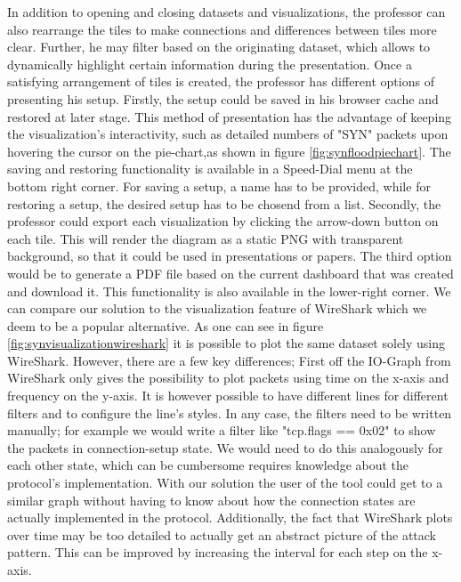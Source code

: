 In addition to opening and closing datasets and visualizations, the professor can also rearrange the tiles to make connections and differences between tiles more clear. Further, he may filter based on the originating dataset, which allows to dynamically highlight certain information during the presentation. Once a satisfying arrangement of tiles is created, the professor has different options of presenting his setup. Firstly, the setup could be saved in his browser cache and restored at later stage. This method of presentation has the advantage of keeping the visualization's interactivity, such as detailed numbers of "SYN" packets upon hovering the cursor on the pie-chart,as shown in figure \ref{fig:synfloodpiechart}. 
The saving and  restoring functionality is available in a Speed-Dial menu at the bottom right corner. For saving a setup, a name has to be provided, while for restoring a setup, the desired setup has to be chosend from a list.
Secondly, the professor could export each visualization by clicking the arrow-down button on each tile. This will render the diagram as a static PNG with transparent background, so that it could be used in presentations or papers.
The third option would be to generate a PDF file based on the current dashboard that was created and download it. This functionality is also available in the lower-right corner.
We can compare our solution to the visualization feature of WireShark which we deem to be a popular alternative.
As one can see in figure \ref{fig:synvisualizationwireshark} it is possible to plot the same dataset solely using WireShark. However, there are a few key differences; First off the IO-Graph from WireShark only gives the possibility to plot packets using time on the x-axis and frequency on the y-axis. It is however possible to have different lines for different filters and to configure the line's styles. In any case, the filters need to be written manually; for example we would write a filter like "tcp.flags == 0x02" to show the packets in connection-setup state. We would need to do this analogously for each other state, which can be cumbersome requires knowledge about the protocol's implementation. With our solution the user of the tool could get to a similar graph without having to know about how the connection states are actually implemented in the protocol. Additionally, the fact that WireShark plots over time may be too detailed to actually get an abstract picture of the attack pattern. This can be improved by increasing the interval for each step on the x-axis.
